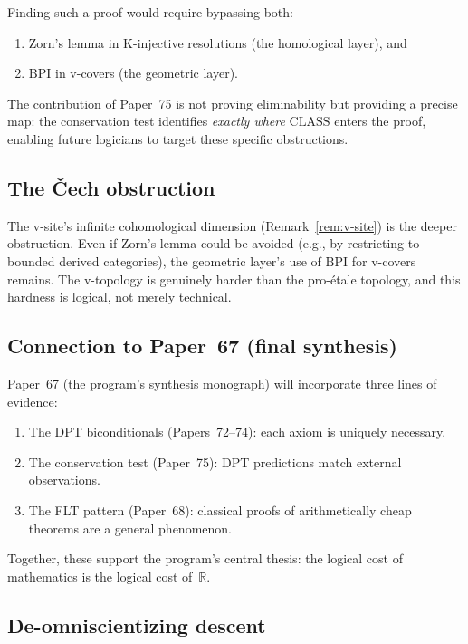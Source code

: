 \documentclass[12pt, a4paper]{article}
\theoremstyle{plain}
\theoremstyle{definition}
\theoremstyle{remark}
\newcommand{\CLASS}{\mathrm{CLASS}}
\newcommand{\BPI}{\mathrm{BPI}}
\begin{document}
Finding such a proof would require bypassing both:
\begin{enumerate}[label=(\roman*)]
  \item Zorn's lemma in K-injective resolutions (the homological
    layer), and
  \item $\BPI$ in v-covers (the geometric layer).
\end{enumerate}
The contribution of Paper~75 is not proving eliminability but
providing a precise map: the conservation test identifies
\emph{exactly where} $\CLASS$ enters the proof, enabling future
logicians to target these specific obstructions.

\subsection{The \v{C}ech obstruction}

The v-site's infinite cohomological dimension
(Remark~\ref{rem:v-site}) is the deeper obstruction.  Even if
Zorn's lemma could be avoided (e.g., by restricting to bounded
derived categories), the geometric layer's use of $\BPI$ for
v-covers remains.  The v-topology is genuinely harder than the
pro-\'etale topology, and this hardness is logical, not merely
technical.

\subsection{Connection to Paper~67 (final synthesis)}

Paper~67 (the program's synthesis monograph) will incorporate
three lines of evidence:
\begin{enumerate}[label=(\arabic*)]
  \item The DPT biconditionals (Papers~72--74): each axiom is
    uniquely necessary.
  \item The conservation test (Paper~75): DPT predictions match
    external observations.
  \item The FLT pattern (Paper~68): classical proofs of
    arithmetically cheap theorems are a general phenomenon.
\end{enumerate}
Together, these support the program's central thesis: the logical
cost of mathematics is the logical cost of~$\mathbb{R}$.

\subsection{De-omniscientizing descent}
\end{document}
